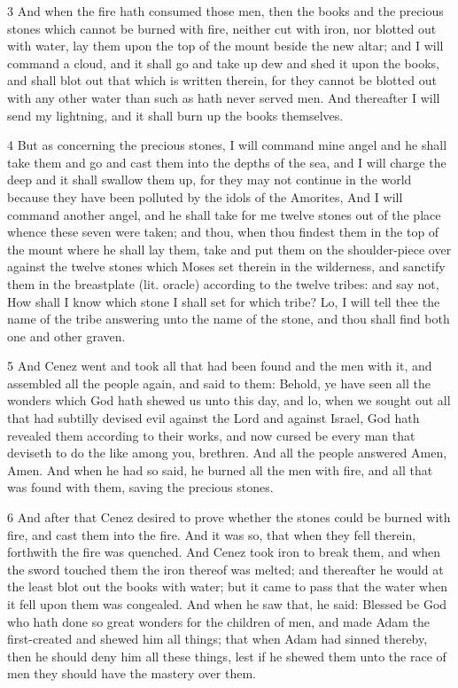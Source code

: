 \par 3 And when the fire hath consumed those men, then the books and the precious stones which cannot be burned with fire, neither cut with iron, nor blotted out with water, lay them upon the top of the mount beside the new altar; and I will command a cloud, and it shall go and take up dew and shed it upon the books, and shall blot out that which is written therein, for they cannot be blotted out with any other water than such as hath never served men. And thereafter I will send my lightning, and it shall burn up the books themselves.

\par 4 But as concerning the precious stones, I will command mine angel and he shall take them and go and cast them into the depths of the sea, and I will charge the deep and it shall swallow them up, for they may not continue in the world because they have been polluted by the idols of the Amorites, And I will command another angel, and he shall take for me twelve stones out of the place whence these seven were taken; and thou, when thou findest them in the top of the mount where he shall lay them, take and put them on the shoulder-piece over against the twelve stones which Moses set therein in the wilderness, and sanctify them in the breastplate (lit. oracle) according to the twelve tribes: and say not, How shall I know which stone I shall set for which tribe? Lo, I will tell thee the name of the tribe answering unto the name of the stone, and thou shall find both one and other graven. 

\par 5 And Cenez went and took all that had been found and the men with it, and assembled all the people again, and said to them: Behold, ye have seen all the wonders which God hath shewed us unto this day, and lo, when we sought out all that had subtilly devised evil against the Lord and against Israel, God hath revealed them according to their works, and now cursed be every man that deviseth to do the like among you, brethren. And all the people answered Amen, Amen. And when he had so said, he burned all the men with fire, and all that was found with them, saving the precious stones.

\par 6 And after that Cenez desired to prove whether the stones could be burned with fire, and cast them into the fire. And it was so, that when they fell therein, forthwith the fire was quenched. And Cenez took iron to break them, and when the sword touched them the iron thereof was melted; and thereafter he would at the least blot out the books with water; but it came to pass that the water when it fell upon them was congealed. And when he saw that, he said: Blessed be God who hath done so great wonders for the children of men, and made Adam the first-created and shewed him all things; that when Adam had sinned thereby, then he should deny him all these things, lest if he shewed them unto the race of men they should have the mastery over them.

